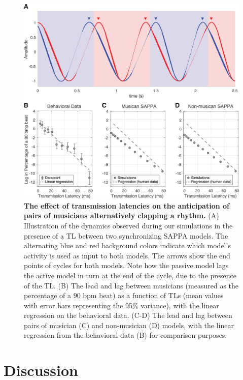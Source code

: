 \documentclass{report}
\begin{document}
\begin{figure}
    \centering
    \includegraphics[width=1.0\textwidth]{figures/fig2_4.png}
    \caption[The effect of transmission latencies on the anticipation of pairs of musicians alternatively clapping a rhythm]{\textbf{The effect of transmission latencies on the anticipation of pairs of musicians alternatively clapping a rhythm.} (A) Illustration of the dynamics observed during our simulations in the presence of a TL between two synchronizing SAPPA models. The alternating blue and red background colors indicate which model's activity is used as input to both models. The arrows show the end points of cycles for both models. Note how the passive model lags the active model in turn at the end of the cycle, due to the presence of the TL. (B) The lead and lag between musicians (measured as the percentage of a 90 bpm beat) as a function of TLs (mean values with error bars representing the 95\% variance), with the linear regression on the behavioral data. (C-D) The lead and lag between pairs of musician (C) and non-musician (D) models, with the linear regression from the behavioral data (B) for comparison purposes.} 
    \label{f2_4}
\end{figure}

\section{Discussion}
\end{document}
